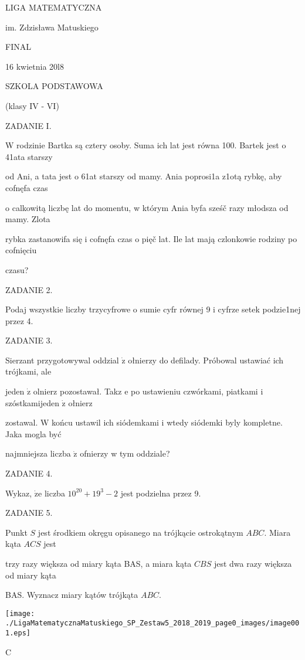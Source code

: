 \documentclass[a4paper,12pt]{article}
\begin{document}
LIGA MATEMATYCZNA

im. Zdzisława Matuskiego

FINAL

16 kwietnia 20l8

SZKOLA PODSTAWOWA

(klasy IV - VI)

ZADANIE I.

W rodzinie Bartka są cztery osoby. Suma ich lat jest równa 100. Bartek jest o 41ata starszy

od Ani, a tata jest o 61at starszy od mamy. Ania poprosi1a z1otą rybkę, aby cofnęfa czas

o calkowitą liczbę lat do momentu, w którym Ania byfa sześč razy młodsza od mamy. Zlota

rybka zastanowifa się i cofnęfa czas o pięč lat. Ile lat mają czlonkowie rodziny po cofnięciu

czasu?

ZADANIE 2.

Podaj wszystkie liczby trzycyfrowe o sumie cyfr równej 9 i cyfrze setek podzie1nej przez 4.

ZADANIE 3.

Sierzant przygotowywal oddzial $\dot{\mathrm{z}}$ ołnierzy do defilady. Próbowal ustawiać ich trójkami, ale

jeden $\dot{\mathrm{z}}$ olnierz pozostawał. Takz $\mathrm{e}$ po ustawieniu czwórkami, piatkami i szóstkamijeden $\dot{\mathrm{z}}$ ołnierz

zostawal. $\mathrm{W}$ końcu ustawil ich siódemkami i wtedy siódemki byly kompletne. Jaka mogla być

najmniejsza liczba $\dot{\mathrm{z}}$ ofnierzy w tym oddziale?

ZADANIE 4.

Wykaz, $\dot{\mathrm{z}}\mathrm{e}$ liczba $10^{20}+19^{3}-2$ jest podzielna przez 9.

ZADANIE 5.

Punkt $S$ jest środkiem okręgu opisanego na trójkącie ostrokątnym $ABC$. Miara kąta $ACS$ jest

trzy razy większa od miary kąta BAS, a miara kąta $CBS$ jest dwa razy większa od miary kąta

BAS. Wyznacz miary kątów trójkąta $ABC.$
\begin{center}
\texttt{[image: ./LigaMatematycznaMatuskiego\_SP\_Zestaw5\_2018\_2019\_page0\_images/image001.eps]}
\end{center}
C
\end{document}
